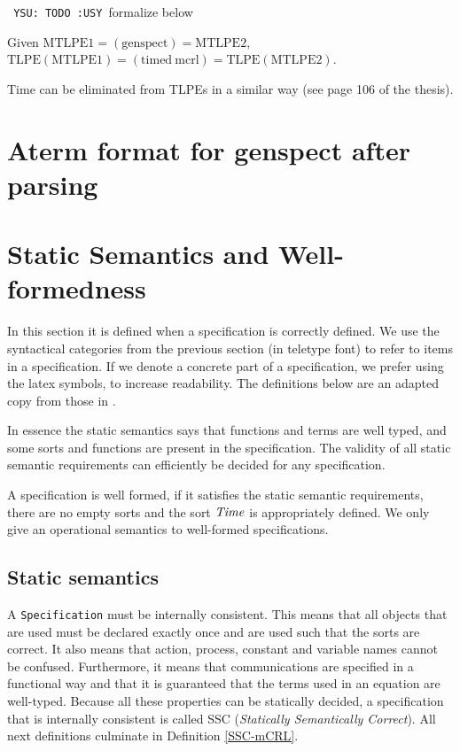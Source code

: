 \documentclass[fleqn,a4paper,dvips]{article}
\def\YSU{\texttt{ YSU: TODO :USY\marginpar{!!!} }}
\begin{document}
\YSU formalize below

\begin{thm}
  Given 
  $\mathrm{MTLPE1}=(\mathrm{genspect})=\mathrm{MTLPE2}$,\\
  $\mathrm{TLPE(MTLPE1)}=(\mathrm{timed\ mcrl})=\mathrm{TLPE(MTLPE2)}$.
\end{thm}

Time can be eliminated from TLPEs in a similar way (see page 106 of
the thesis).

\appendix
\newpage
\section{Aterm format for genspect after parsing}

\section{Static Semantics and Well-formedness}
\label{section:SSC} 
In this section it is defined when a specification is correctly defined.
We use the syntactical categories from the previous section (in teletype
font) to refer to items in a specification. If we denote a
concrete part of a specification, we prefer using the latex symbols, to
increase readability. The definitions below are an adapted copy from those in
\cite{GroPo94a}.

In
essence the static semantics says that functions and terms are well
typed, and some sorts and functions are present in the specification. The
validity of all static semantic requirements can efficiently be decided for any
specification.

A specification is well formed, if it satisfies the static semantic requirements,
there are no empty sorts and the sort $\mathit{Time}$ is appropriately defined. We
only give an operational semantics to well-formed specifications.

\subsection{Static semantics}
A {\tt Specification} must be internally consistent. This means
that all objects that are used must be declared exactly once and 
are used such that the sorts are correct. It also means that action,
process, constant and variable names cannot be confused.
Furthermore, it means that communications are specified in a functional
way and that it is guaranteed that the terms used in an equation are well-typed.
Because all these properties can be statically decided, a
specification that is internally consistent is called SSC
({\em Statically Semantically Correct}). All next definitions
culminate in Definition \ref{SSC-mCRL}.
\end{document}
